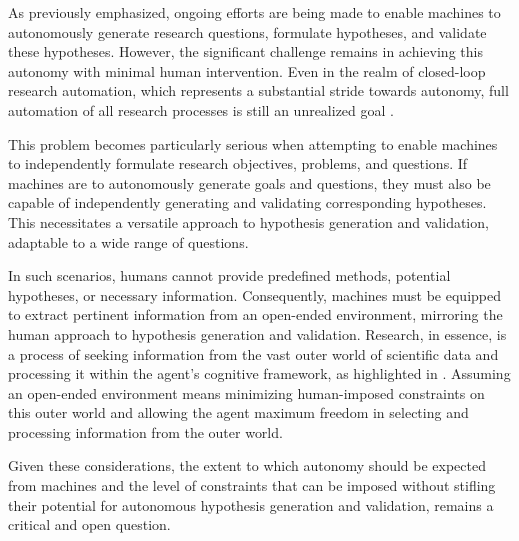 As previously emphasized, ongoing efforts are being made to enable machines to autonomously generate research questions, formulate hypotheses, and validate these hypotheses. However, the significant challenge remains in achieving this autonomy with minimal human intervention. Even in the realm of closed-loop research automation, which represents a substantial stride towards autonomy, full automation of all research processes is still an unrealized goal \cite{zenil2023,coley2020autonomous,coley2020autonomousII}.

This problem becomes particularly serious when attempting to enable machines to independently formulate research objectives, problems, and questions. If machines are to autonomously generate goals and questions, they must also be capable of independently generating and validating corresponding hypotheses. This necessitates a versatile approach to hypothesis generation and validation, adaptable to a wide range of questions.

In such scenarios, humans cannot provide predefined methods, potential hypotheses, or necessary information. Consequently, machines must be equipped to extract pertinent information from an open-ended environment, mirroring the human approach to hypothesis generation and validation. Research, in essence, is a process of seeking information from the vast outer world of scientific data and processing it within the agent's cognitive framework, as highlighted in \cite{hope2022computational}. Assuming an open-ended environment means minimizing human-imposed constraints on this outer world and allowing the agent maximum freedom in selecting and processing information from the outer world.

Given these considerations, the extent to which autonomy should be expected from machines and the level of constraints that can be imposed without stifling their potential for autonomous hypothesis generation and validation, remains a critical and open question.


